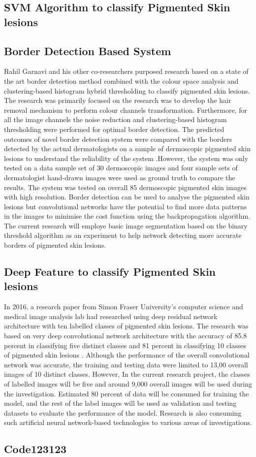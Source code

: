 \subsection{SVM Algorithm to classify Pigmented Skin lesions}

\subsection{Border Detection Based System}
Rahil Garnavi and his other co-researchers purposed research based on a state of the art border detection method combined with the colour space analysis and clustering-based histogram hybrid thresholding 
to classify pigmented skin lesions. The research was primarily focused on the research was to develop the hair removal mechanism to perform colour channels transformation. Furthermore, for all the image channels the noise reduction 
and clustering-based histogram thresholding were performed for optimal border detection. The predicted outcomes of novel border detection system were compared with the 
borders detected by the actual dermatologists on a sample of 
dermoscopic pigmented skin lesions to understand the reliability of the 
system \citep{GARNAVI2011105}.However, the system was only tested on a data sample set of 
30 dermoscopic images and four sample sets of dermatologist hand-drawn images were used as ground
truth to compare the results. The system was tested on overall 85 dermoscopic pigmented skin images 
with high resolution. Border detection can be used to analyse the pigmented skin lesions but 
convolutional networks have the potential to find more data patterns in the images to minimise 
the cost function using the backpropagation algorithm. The current research will employe basic image
segmentation based on the binary threshold algorithm as an experiment to help network detecting more accurate
borders of pigmented skin lesions.

\subsection{Deep Feature to classify Pigmented Skin lesions}
In 2016, a research paper from Simon Fraser University’s computer science and medical image analysis lab had researched using 
deep residual network architecture with ten labelled 
classes of pigmented skin lesions. The research was based on very 
deep convolutional network architecture with the accuracy 
of 85.8 percent in classifying five distinct classes and
81 percent in classifying 10 classes of pigmented skin lesions
\citep{7493528}. Although the performance of the overall convolutional network was accurate, the training and testing data were limited to 13,00 overall images of 10 distinct classes.
However, In the current research project, the classes of labelled images will be five and around 9,000 overall images will be used during the investigation.
Estimated 80 percent of data will be consumed for training the model, and the rest of the label images will be used as validation and testing datasets 
to evaluate the performance of the model. Research is also consuming such artificial neural network-based technologies to various areas of investigations.
\pagebreak
\subsection{Code123123}